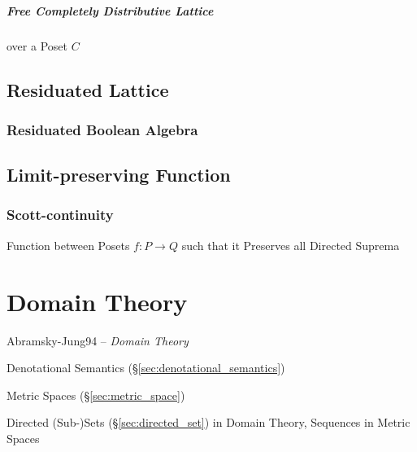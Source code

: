 \subparagraph{Free Completely Distributive Lattice}
\label{sec:free_completely_distributive_lattice}\hfill

over a Poset $C$



\subsection{Residuated Lattice}\label{sec:residuated_lattice}

\subsubsection{Residuated Boolean Algebra}
\label{sec:residuated_boolean_algebra}



\subsection{Limit-preserving Function}\label{sec:limit_preserving}

\subsubsection{Scott-continuity}\label{sec:scott_continuity}

Function between Posets $f : P \rightarrow Q$ such that it Preserves
all Directed Suprema %



\section{Domain Theory}\label{sec:domain_theory}

Abramsky-Jung94 -- \emph{Domain Theory}

Denotational Semantics (\S\ref{sec:denotational_semantics})

Metric Spaces (\S\ref{sec:metric_space})

Directed (Sub-)Sets (\S\ref{sec:directed_set}) in Domain Theory,
Sequences in Metric Spaces

